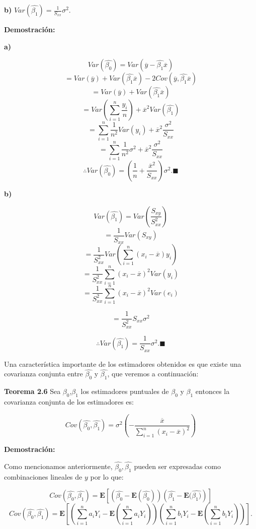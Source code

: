 \documentclass[
  a4paper,
  oneside,
  openany]{book}
\begin{document}
\textbf{b)} \(Var\left(\hat{\beta_{1}}\right)= \frac{1}{S_{xx}} \sigma^2.\)

\textbf{Demostración:}

\textbf{a)}

\[Var\left(\hat{\beta_{0}}\right)=Var\left(\overline{y}-\hat{\beta_{1}}\overline{x}\right)\]
\[=Var(\overline{y})+Var(\hat{\beta_{1}}\overline{x})-2Cov(\overline{y},\hat{\beta_{1}}\overline{x})\]
\[=Var(\overline{y})+Var(\hat{\beta_{1}}\overline{x})\]
\[=Var\left(\sum_{i=1}^{n}\frac{y_{i}}{n} \right)+\overline{x}^2Var(\hat{\beta_{1}})\]
\[=\sum_{i=1}^{n}\frac{1}{n^2}Var(y_{i})+\overline{x}^2\frac{\sigma^2}{S_{xx}}\]
\[=\sum_{i=1}^{n}\frac{1}{n^2}\sigma^2+\overline{x}^2\frac{\sigma^2}{S_{xx}}\]
\[\therefore Var\left(\hat{\beta_{0}}\right)=\left(\frac{1}{n}+\frac{\overline{x}^2}{S_{xx}}\right) \sigma^2. \blacksquare\]

\textbf{b)}

\[Var\left(\hat{\beta_{1}}\right)= Var\left( \frac{S_{xy}}{S_{xx}^2}\right)\]
\[= \frac{1}{S_{xx}}Var\left(S_{xy}\right)\]
\[=\frac{1}{S_{xx}^2}Var\left( \sum_{i=1}^{n}(x_{i}-\overline{x})y_{i}\right)\]
\[=\frac{1}{S_{xx}^2} \sum_{i=1}^{n}(x_{i}-\overline{x})^2Var(y_{i})\]
\[=\frac{1}{S_{xx}^2}\sum_{i=1}^{n}(x_{i}-\overline{x})^2Var(e_{i})\]

\[=\frac{1}{S_{xx}^2}S_{xx}\sigma^2\]

\[\therefore Var\left(\hat{\beta_{1}}\right)= \frac{1}{S_{xx}} \sigma^2. \blacksquare\]

Una característica importante de los estimadores obtenidos es que existe una covarianza conjunta entre \(\hat{\beta_{0}}\) y \(\hat{\beta_{1}}\), que veremos a continuación:

\textbf{Teorema 2.6} Sea \(\beta_{0}\),\(\beta_{1}\) los estimadores puntuales de \(\beta_{0}\) y \(\beta_{1}\) entonces la covarianza conjunta de los estimadores es:

\[Cov\left(\hat{\beta_{0}},\hat{\beta_{1}}\right)=\sigma^2\left(-\frac{\overline{x}}{\sum_{i=1}^{n}(x_{i}-\overline{x})^2}\right)\]

\textbf{Demostración:}

Como mencionamos anteriormente, \(\hat{\beta_{0}},\hat{\beta_{1}}\) pueden ser expresadas como combinaciones lineales de \(y\) por lo que:

\[Cov\left(\hat{\beta_{0}},\hat{\beta_{1}} \right)= \mathbf{E}\left[ \left( \hat{\beta_{0}}-\mathbf{E}(\hat{\beta_{0}})\right)\left(\hat{\beta_{1}}-\mathbf{E}(\hat{\beta_{1})} \right) \right]\]
\[Cov\left(\hat{\beta_{0}},\hat{\beta_{1}} \right)= \mathbf{E}\left[\left(\sum_{i=1}^{n}a_{i}Y_{i}-\mathbf{E}(\sum_{i=1}^{n}a_{i}Y_{i}) \right)\left(\sum_{i=1}^{n}b_{i}Y_{i}-\mathbf{E}(\sum_{i=1}^{n}b_{i}Y_{i}) \right)\right].\]
\end{document}
